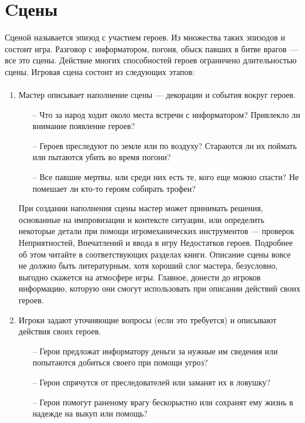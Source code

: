 \section{Cцены}
Сценой называется эпизод с участием героев. Из множества таких эпизодов и состоит игра. Разговор с информатором, погоня, обыск павших в битве врагов — все это сцены. Действие многих способностей героев ограничено длительностью сцены.
Игровая сцена состоит из следующих этапов:
\paragraph{}
\begin{enumerate}

 \item Мастер описывает наполнение сцены — декорации и события вокруг героев.
\begin{itemize}
\item[--] Что за народ ходит около места встречи с информатором? Привлекло ли внимание появление героев?
\item[--] Героев преследуют по земле или по воздуху? Стараются ли их поймать или пытаются убить во время погони?
\item[--] Все павшие мертвы, или среди них есть те, кого еще можно спасти? Не помешает ли кто-то героям собирать трофеи?
\end{itemize}
При создании наполнения сцены мастер может принимать решения, основанные на импровизации и контексте ситуации, или определить некоторые детали при помощи игромеханических инструментов — проверок Неприятностей, Впечатлений и ввода в игру Недостатков героев. Подробнее об этом читайте в соответствующих разделах книги.
\linebreak
Описание сцены вовсе не должно быть литературным, хотя хороший слог мастера, безусловно, выгодно скажется на атмосфере игры. Главное, донести до игроков информацию, которую они смогут использовать при описании действий своих героев.
 \item Игроки задают уточняющие вопросы (если это требуется) и описывают действия своих героев.
\begin{itemize}
\item[--] Герои предложат информатору деньги за нужные им сведения или попытаются добиться своего при помощи угроз?
\item[--] Герои спрячутся от преследователей или заманят их в ловушку?
\item[--] Герои помогут раненому врагу бескорыстно или сохранят ему жизнь в надежде на выкуп или помощь?

\end{itemize}
\end{enumerate}
